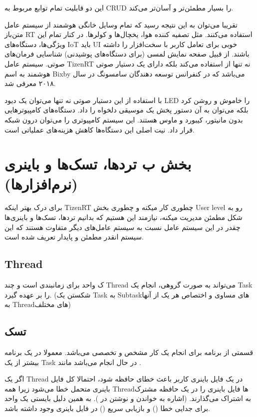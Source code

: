\documentclass[10pt, a4paper]{article}
\begin{document}
این دو قابلیت تمام توابع مربوط به CRUD را بسیار مطمئن‌تر و آسان‌تر می‌کند.

تقریبا می‌توان به این نتیجه رسید که تمام وسایل خانگی هوشمند از سیستم عامل
متن‌باز RT استفاده می‌کنند. مثل تصفیه کننده هوا، یخچال‌ها و کولر‌ها. در کنار
تمام این ویژگی‌ها، دستگاه‌های IoT باید UI خوبی برای تعامل کاربر با سخت‌افزار را
داشته باشند. از قبیل صفحه نمایش لمسی (برای دستگاه‌های پوشیدنی) شناسایی فرمان‌های
صوتی. سیستم عامل TizenRT نه تنها از  استفاده می‌کند
بلکه دارای یک دستیار صوتی هوشمند به اسم Bixby می‌باشد که در کنفرانس توسعه
دهندگان سامسونگ در سال ۲۰۱۸ \cite{samsungbixby} معرفی شد.

با استفاده از این دستیار صوتی نه تنها می‌توان یک دیود LED را خاموش و روشن کرد
بلکه می‌توان به آن دستور پخش یک موسیقی دلخواه را داد. دستگاه‌های  کامپیوتر‌هایی بدون مانیتور، کیبورد و ماوس‌ هستند.  این سیستم کامپیوتری
را می‌توان درون شبکه قرار داد. نیت اصلی این دستگاه‌ها کاهش هزینه‌های عملیاتی
است.

\section{بخش ب ترد‌ها، تسک‌ها و باینری (نرم‌افزار‌ها)}

برای درک بهتر اینکه TizenRT چطوری کار میکنه و چطوری بخش User level رو به شکل
مطمئن مدیریت میکنه، نیازمند این هستیم که بدانیم تردها، تسک‌ها و باینری‌ها چقدر
در این سیستم عامل نسبت به سیستم عامل‌های دیگر متفاوت هستند که این سیستم انقدر
مطمئن و پایدار تعریف شده است.

\subsection{Thread}

ک واحد برای زمانبندی است و چند Thread می‌تواند به صورت گروهی، انجام یک Task را
بر عهده گیرد. (شکستن یک Task به Subtask‌های مساوی و اختصاص هر یک از آنها به
Threadهای مختلف)

\subsection{تسک}

قسمتی از برنامه برای انجام یک کار مشخص و تخصصی می‌باشد. معمولا در یک برنامه
بیشتر از یک Task در حال انجام می‌باشد \cite{tizenrtrepo} مانند .

اگر یک Thread در یک فایل باینری کاربر باعث خطای حافظه شود، احتمالا کل فایل‌
باینری متحمل خطا می‌شود زیرا همه Threadها فایل باینری را در یک حافظه مشترک به
اشتراک می‌گذارند. (اشاره به خواندن و نوشتن در ). به همین دلیل
بایستی یک واحد برای جدایی خطا () و بازیابی سریع () در فایل باینری وجود داشته باشد.
\end{document}
